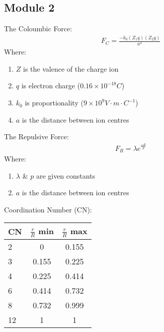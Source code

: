\documentclass{article}
\begin{document}
\begin{multicols}{2}

\section{Module 2}

\normalsize
The Coloumbic Force:
\begin{equation*}
    \begin{split}
        F_C = \frac{-k_0(Z_1 q)(Z_2 q)}{a^2}
    \end{split}
\end{equation*}
Where:
\begin{enumerate}
    \setlength\itemsep{-0.5em}
    \item $Z$ is the valence of the charge ion
    \item $q$ is electron charge ($0.16 \times 10^{-18}C$)
    \item $k_0$ is proportionality ($9 \times 10^9 V \cdot m \cdot C^{-1}$)
    \item $a$ is the distance between ion centres
\end{enumerate}
The Repulsive Force:
\begin{equation*}
    \begin{split}
        F_R = \lambda e^{\frac{-a}{p}}
    \end{split}
\end{equation*}
Where:
\begin{enumerate}
    \setlength\itemsep{-0.5em}
    \item $\lambda$ \& $p$ are given constants 
    \item $a$ is the distance between ion centres
\end{enumerate}

Coordination Number (CN):

\begin{center}
    \begin{tabular}{ l c c }
        CN & $\frac{r}{R}$ min & $\frac{r}{R}$ max \\
        \hline
        2  &   0   & 0.155 \\ 
        3  & 0.155 & 0.225 \\  
        4  & 0.225 & 0.414 \\  
        6  & 0.414 & 0.732 \\  
        8  & 0.732 & 0.999 \\  
        12 &   1   &   1
    \end{tabular}
\end{center}



\end{multicols}
\end{document}
